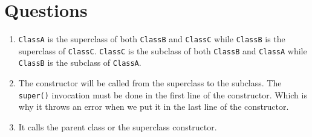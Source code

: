 \documentclass[12pt,titlepage]{article}
\begin{document}
\section{Questions}
\begin{enumerate}
    \item {
        \texttt{ClassA} is the superclass of both \texttt{ClassB} and \texttt{ClassC} while \texttt{ClassB} is the superclass
        of \texttt{ClassC}.
        \texttt{ClassC} is the subclass of both \texttt{ClassB} and \texttt{ClassA} while \texttt{ClassB} is the subclass
        of \texttt{ClassA}.
    }
    \item {
        The constructor will be called from the superclass to the subclass. The \texttt{super()} invocation
        must be done in the first line of the constructor. Which is why it throws an error when
        we put it in the last line of the constructor.
    }
    \item {
        It calls the parent class or the superclass constructor.
    }
\end{enumerate}

\pagebreak
\end{document}
